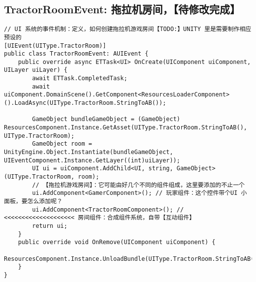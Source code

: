 \documentclass[9pt, b5paper]{article}
\begin{document}
\subsection{TractorRoomEvent: 拖拉机房间，【待修改完成】}
\label{sec-3-1}
\begin{verbatim}
// UI 系统的事件机制：定义，如何创建拖拉机游戏房间【TODO:】UNITY 里是需要制作相应预设的
[UIEvent(UIType.TractorRoom)]
public class TractorRoomEvent: AUIEvent {
    public override async ETTask<UI> OnCreate(UIComponent uiComponent, UILayer uiLayer) {
        await ETTask.CompletedTask;
        await uiComponent.DomainScene().GetComponent<ResourcesLoaderComponent>().LoadAsync(UIType.TractorRoom.StringToAB());

        GameObject bundleGameObject = (GameObject) ResourcesComponent.Instance.GetAsset(UIType.TractorRoom.StringToAB(), UIType.TractorRoom);
        GameObject room = UnityEngine.Object.Instantiate(bundleGameObject, UIEventComponent.Instance.GetLayer((int)uiLayer));
        UI ui = uiComponent.AddChild<UI, string, GameObject>(UIType.TractorRoom, room);
        // 【拖拉机游戏房间】：它可能由好几个不同的组件组成，这里要添加的不止一个
        ui.AddComponent<GamerComponent>(); // 玩家组件：这个控件带个UI 小面板，要怎么添加呢？
        ui.AddComponent<TractorRoomComponent>(); // <<<<<<<<<<<<<<<<<<<< 房间组件：合成组件系统，自带【互动组件】
        return ui;
    }
    public override void OnRemove(UIComponent uiComponent) {
        ResourcesComponent.Instance.UnloadBundle(UIType.TractorRoom.StringToAB());
    }
}
\end{verbatim}
\end{document}
